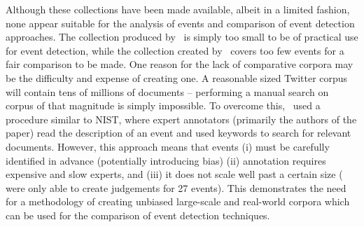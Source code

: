 Although these collections have been made available, albeit in a limited fashion, none appear suitable for the analysis of events and comparison of event detection approaches.
The collection produced by~\citeauthor{Becker:2012:ICP:2124295.2124360} is simply too small to be of practical use for event detection, while the collection created by~\citeauthor{Petrovic:2012:UPI:2382029.2382072} covers too few events for a fair comparison to be made.
One reason for the lack of comparative corpora may be the difficulty and expense of creating one.
A reasonable sized Twitter corpus will contain tens of millions of documents -- performing a manual search on corpus of that magnitude is simply impossible.
To overcome this,~\citeauthor{Petrovic:2012:UPI:2382029.2382072} used a procedure similar to NIST, where expert annotators (primarily the authors of the paper) read the description of an event and used keywords to search for relevant documents.
However, this approach means that events (i) must be carefully identified in advance (potentially introducing bias) (ii) annotation requires expensive and slow experts, and (iii) it does not scale well past a certain size (\citeauthor{Petrovic:2012:UPI:2382029.2382072} were only able to create judgements for 27 events). This demonstrates the need for a methodology of creating unbiased large-scale and real-world corpora which can be used for the comparison of event detection techniques.